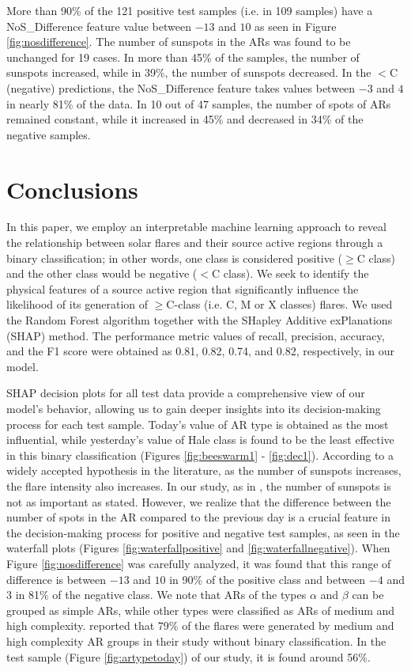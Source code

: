 \documentclass[draft]{agujournal2019}
\begin{document}
More than 90\% of the 121 positive test samples (i.e. in 109 samples) have a \\
NoS\_Difference feature value between $-13$ and $10$ as seen in Figure \ref{fig:nosdifference}. The number of sunspots in the ARs was found to be unchanged for 19 cases. In more than 45\% of the samples, the number of sunspots increased, while in 39\%, the number of sunspots decreased. In the $<$C (negative) predictions, the NoS\_Difference feature takes values between $-3$ and $4$ in nearly 81\% of the data. In 10 out of 47 samples, the number of spots of ARs remained constant, while it increased in 45\% and decreased in 34\% of the negative samples. 

\section{Conclusions}
\label{sec:conclusions}

In this paper, we employ an interpretable machine learning approach to reveal the relationship between solar flares and their source active regions through a binary classification; in other words, one class is considered positive ($\geq$C class) and the other class would be negative ($<$C class). We seek to identify the physical features of a source active region that significantly influence the likelihood of
its generation of $\geq$C-class (i.e. C, M or X classes) flares. We used the Random Forest algorithm together with the SHapley Additive exPlanations (SHAP) method. The performance metric values of recall, precision, accuracy, and the F1 score were obtained as 0.81, 0.82, 0.74, and 0.82, respectively, in our model. 

SHAP decision plots for all test data provide a comprehensive view of our model's behavior, allowing us to gain deeper insights into its decision-making process
for each test sample. Today's value of AR type is obtained as the most influential, while yesterday's value of Hale class is found to be the least effective in this binary classification (Figures \ref{fig:beeswarm1} - \ref{fig:dec1}). According to a widely accepted hypothesis in the literature, as the number of sunspots increases, the flare intensity also increases. In our study, as in \cite{2004AAS...205.1002S}, the number of sunspots is not as important as stated. However, we realize that the difference between the number of spots in the AR compared to the previous day is a crucial feature in the decision-making process for positive and negative test samples, as seen in the waterfall plots (Figures \ref{fig:waterfallpositive} and \ref{fig:waterfallnegative}). When Figure \ref{fig:nosdifference} was carefully analyzed, it was found that this range of difference is between $-13$ and $10$ in 90\% of the positive class and between $-4$ and $3$ in 81\% of the negative class. 
We note that ARs of the types $\alpha$ and $\beta$ can be grouped as simple ARs, while other types were classified as ARs of medium and high complexity. \cite{10.1093/mnras/stw2742} reported that 79\% of the flares were generated by medium and high complexity AR groups in their study without binary classification. In the test sample (Figure \ref{fig:artypetoday}) of our study, it is found around 56\%. 
\end{document}
